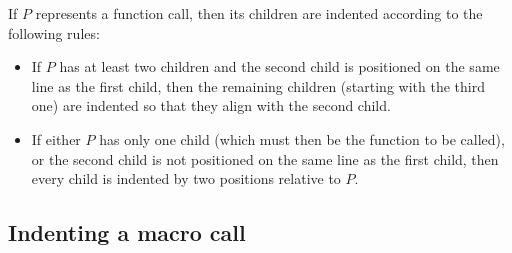If $P$ represents a function call, then its children are indented
according to the following rules:

\begin{itemize}
\item If $P$ has at least two children and the second child is
  positioned on the same line as the first child, then the remaining
  children (starting with the third one) are indented so that they
  align with the second child.
\item If either $P$ has only one child (which must then be the
  function to be called), or the second child is not positioned on the
  same line as the first child, then every child is indented by two
  positions relative to $P$.
\end{itemize}

\subsection{Indenting a macro call}
